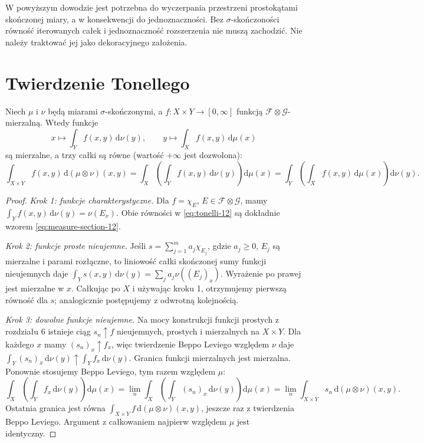 \begin{uwaga}
W powyższym dowodzie jest potrzebna do
wyczerpania przestrzeni prostokątami skończonej
miary, a w konsekwencji do jednoznaczności.
Bez $\sigma$-skończoności równość iterowanych całek
i jednoznaczność rozszerzenia nie muszą zachodzić.
Nie należy traktować jej jako dekoracyjnego założenia.
\end{uwaga}

\section{Twierdzenie Tonellego}

\begin{twierdzenie}[Tonelli]
\label{thm:tonelli-12}
Niech $\mu$ i $\nu$ będą miarami $\sigma$-skończonymi,
a $f:X\times Y\to[0,\infty]$ funkcją
$\mathcal F\otimes\mathcal G$-mierzalną.
Wtedy funkcje
\[
x\longmapsto\int_Y f(x,y)\,\mathrm d\nu(y),
\qquad
y\longmapsto\int_X f(x,y)\,\mathrm d\mu(x)
\]
są mierzalne, a trzy całki są równe
(wartość $+\infty$ jest dozwolona):
\begin{equation}\label{eq:tonelli-12}
\int_{X\times Y}f(x,y)\,\mathrm d(\mu\otimes\nu)(x,y)
=\int_X\left(\int_Yf(x,y)\,\mathrm d\nu(y)\right)
\mathrm d\mu(x)
=\int_Y\left(\int_Xf(x,y)\,\mathrm d\mu(x)\right)
\mathrm d\nu(y).
\end{equation}
\end{twierdzenie}
\begin{proof}
\emph{Krok 1: funkcje charakterystyczne.}
Dla $f=\chi_E$, $E\in\mathcal F\otimes\mathcal G$,
mamy $\int_Yf(x,y)\,\mathrm d\nu(y)=\nu(E_x)$.
Obie równości w \eqref{eq:tonelli-12} są dokładnie
wzorem \eqref{eq:measure-section-12}.

\emph{Krok 2: funkcje proste nieujemne.}
Jeśli $s=\sum_{j=1}^m a_j\chi_{E_j}$,
gdzie $a_j\ge0$, $E_j$ są mierzalne i parami
rozłączne, to liniowość całki skończonej sumy
funkcji nieujemnych daje
$\int_Y s(x,y)\,\mathrm d\nu(y)
=\sum_j a_j\nu((E_j)_x)$.
Wyrażenie po prawej jest mierzalne w $x$.
Całkując po $X$ i używając kroku 1,
otrzymujemy pierwszą równość dla $s$;
analogicznie postępujemy z odwrotną kolejnością.

\emph{Krok 3: dowolne funkcje nieujemne.}
Na mocy konstrukcji funkcji prostych z rozdziału 6
istnieje ciąg $s_n\uparrow f$ nieujemnych,
prostych i mierzalnych na $X\times Y$.
Dla każdego $x$ mamy $(s_n)_x\uparrow f_x$,
więc twierdzenie Beppo Leviego względem $\nu$
daje $\int_Y(s_n)_x\,\mathrm d\nu(y)\uparrow
\int_Yf_x\,\mathrm d\nu(y)$. Granica funkcji
mierzalnych jest mierzalna. Ponownie stosujemy
Beppo Leviego, tym razem względem $\mu$:
\[
\int_X\left(\int_Y f_x\,\mathrm d\nu(y)\right)\mathrm d\mu(x)
=\lim_n\int_X\left(\int_Y (s_n)_x\,\mathrm d\nu(y)\right)\mathrm d\mu(x)
=\lim_n\int_{X\times Y}s_n\,\mathrm d(\mu\otimes\nu)(x,y).
\]
Ostatnia granica jest równa
$\int_{X\times Y}f\,\mathrm d(\mu\otimes\nu)(x,y)$,
jeszcze raz z twierdzenia Beppo Leviego.
Argument z całkowaniem najpierw względem $\mu$
jest identyczny.
\end{proof}

